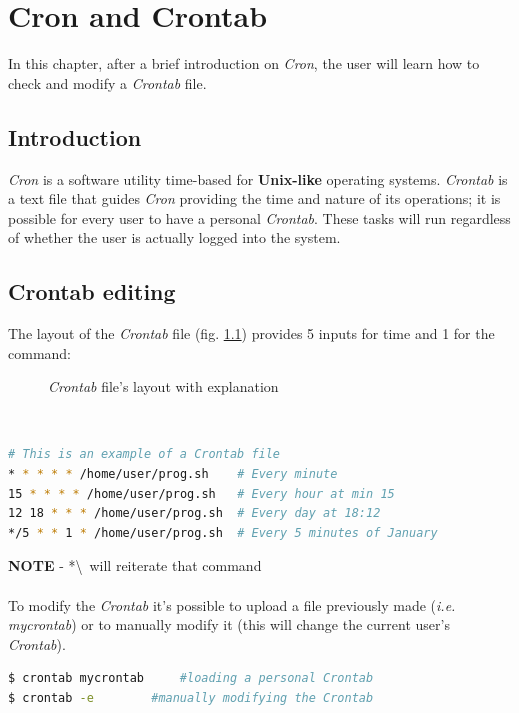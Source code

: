 \documentclass[12pt,a4paper]{report}
\begin{document}
\chapter{Cron and Crontab} \label{cron}
In this chapter, after a brief introduction on \textit{Cron}, the user will learn how to check and modify a \textit{Crontab} file.
\section{Introduction}
\textit{Cron} is a software utility time-based for \textbf{Unix-like} operating systems. \textit{Crontab} is a text file that guides \textit{Cron} providing the time and nature of its operations; it is possible for every user to have a personal \textit{Crontab}. These tasks will run regardless of whether the user is actually logged into the system.
\section{Crontab editing}
The layout of the \textit{Crontab} file (fig. \ref{crnlay}) provides 5 inputs for time and 1 for the command:
\begin{figure}[h!]
\centering
{}
\caption{\textit{Crontab} file's layout with explanation}
\label{crnlay}
\end{figure}
\\
\begin{lstlisting}[language=bash]
# This is an example of a Crontab file
* * * * * /home/user/prog.sh	# Every minute
15 * * * * /home/user/prog.sh	# Every hour at min 15
12 18 * * * /home/user/prog.sh	# Every day at 18:12
*/5 * * 1 * /home/user/prog.sh	# Every 5 minutes of January
\end{lstlisting} 
\textbf{NOTE} - *\textbackslash \ will reiterate that command \\ \\
To modify the \textit{Crontab} it's possible to upload a file previously made (\textit{i.e. mycrontab}) or to manually modify it (this will change the current user's \textit{Crontab}). \\
\begin{lstlisting}[language=bash]
$ crontab mycrontab 	#loading a personal Crontab
$ crontab -e	 	#manually modifying the Crontab
\end{lstlisting}
\end{document}
